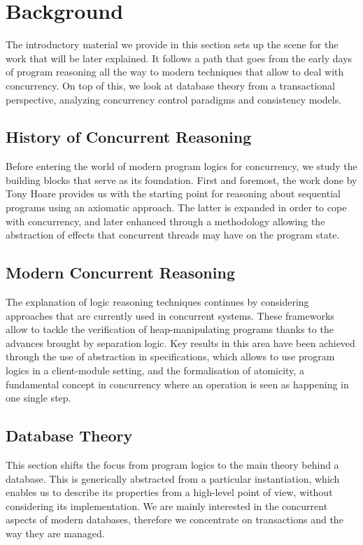 \chapter{Background}

The introductory material we provide in this section sets up the scene for the work that will be later explained. It follows a path that goes from the early days of program reasoning all the way to modern techniques that allow to deal with concurrency. On top of this, we look at database theory from a transactional perspective, analyzing concurrency control paradigms and consistency models.

\section{History of Concurrent Reasoning}

Before entering the world of modern program logics for concurrency, we study the building blocks that serve as its foundation. First and foremost, the work done by Tony Hoare provides us with the starting point for reasoning about sequential programs using an axiomatic approach. The latter is expanded in order to cope with concurrency, and later enhanced through a methodology allowing the abstraction of effects that concurrent threads may have on the program state.



\section{Modern Concurrent Reasoning}

The explanation of logic reasoning techniques continues by considering approaches that are currently used in concurrent systems. These frameworks allow to tackle the verification of heap-manipulating programs thanks to the advances brought by separation logic. Key results in this area have been achieved through the use of abstraction in specifications, which allows to use program logics in a client-module setting, and the formalisation of atomicity, a fundamental concept in concurrency where an operation is seen as happening in one single step.



\section{Database Theory}

This section shifts the focus from program logics to the main theory behind a database. This is generically abstracted from a particular instantiation, which enables us to describe its properties from a high-level point of view, without considering its implementation. We are mainly interested in the concurrent aspects of modern databases, therefore we concentrate on transactions and the way they are managed.

